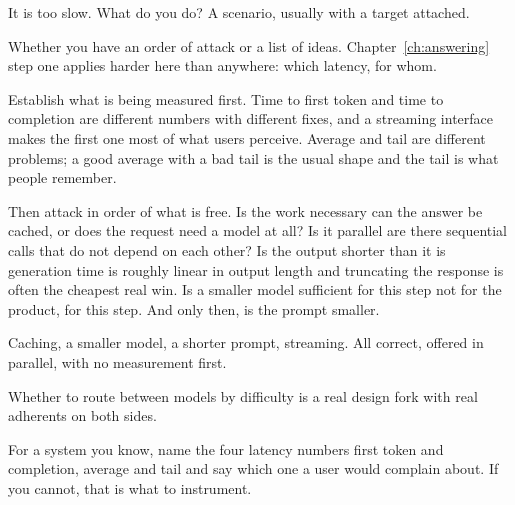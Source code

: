 \begin{bankq}{It is too slow. What do you do?}
\qasked
A scenario, usually with a target attached.

\qtested
Whether you have an order of attack or a list of ideas. Chapter~\ref{ch:answering}
step one applies harder here than anywhere: which latency, for whom.

\qstaff
Establish what is being measured first. Time to first token and time to
completion are different numbers with different fixes, and a streaming
interface makes the first one most of what users perceive. Average and tail are
different problems; a good average with a bad tail is the usual shape and the
tail is what people remember.

Then attack in order of what is free. Is the work necessary \dash{} can the
answer be cached, or does the request need a model at all? Is it parallel
\dash{} are there sequential calls that do not depend on each other? Is the
output shorter than it is \dash{} generation time is roughly linear in output
length and truncating the response is often the cheapest real win. Is a smaller
model sufficient for this step \dash{} not for the product, for this step. And
only then, is the prompt smaller.


\qsenior
Caching, a smaller model, a shorter prompt, streaming. All correct, offered in
parallel, with no measurement first.

\qcontested
Whether to route between models by difficulty is a real design fork with real
adherents on both sides. 

\qdrill
For a system you know, name the four latency numbers \dash{} first token and
completion, average and tail \dash{} and say which one a user would complain
about. If you cannot, that is what to instrument.
\end{bankq}


